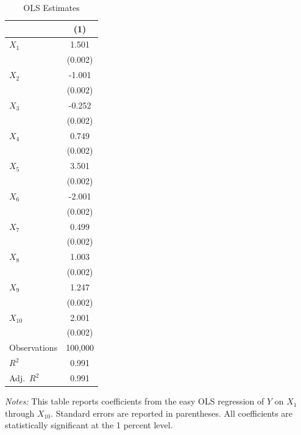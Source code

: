 \documentclass[12pt]{article}
\begin{document}
\begin{table}[!htbp]
\centering
\caption{OLS Estimates}
\label{tab:ols_estimates}
\vspace{0.3em}
\begin{minipage}{0.70\textwidth}
\centering
\small
\begin{tabular}{lc}
\toprule
& (1) \\
\midrule
$X_1$     & 1.501 \\
          & (0.002) \\
$X_2$     & -1.001 \\
          & (0.002) \\
$X_3$     & -0.252 \\
          & (0.002) \\
$X_4$     & 0.749 \\
          & (0.002) \\
$X_5$     & 3.501 \\
          & (0.002) \\
$X_6$     & -2.001 \\
          & (0.002) \\
$X_7$     & 0.499 \\
          & (0.002) \\
$X_8$     & 1.003 \\
          & (0.002) \\
$X_9$     & 1.247 \\
          & (0.002) \\
$X_{10}$  & 2.001 \\
          & (0.002) \\
\midrule
Observations   & 100{,}000 \\
$R^2$          & 0.991 \\
Adj.\ $R^2$    & 0.991 \\
\bottomrule
\end{tabular}

\vspace{0.3em}
\begin{minipage}{\textwidth}
\footnotesize
\emph{Notes:} This table reports coefficients from the easy OLS regression of $Y$ on $X_1$ through $X_{10}$. Standard errors are reported in parentheses. All coefficients are statistically significant at the 1 percent level.
\end{minipage}
\end{minipage}
\end{table}







\end{document}
